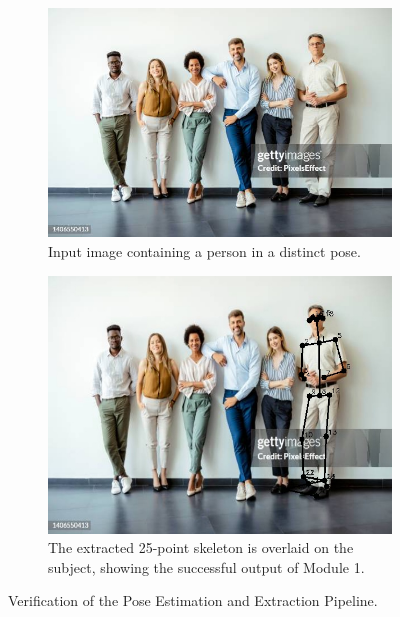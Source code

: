 \documentclass{article}
\begin{document}
\begin{figure}[h!]
    \centering
    \begin{subfigure}[b]{0.48\textwidth}
        \includegraphics[width=\textwidth]{Testing/test1.jpg}
        \caption{Input image containing a person in a distinct pose.}
        \label{fig:input_image}
    \end{subfigure}
    \hfill
    \begin{subfigure}[b]{0.48\textwidth}
        \includegraphics[width=\textwidth]{Testing/output_pose.jpg}
        \caption{The extracted 25-point skeleton is overlaid on the subject, showing the successful output of Module 1.}
        \label{fig:skeleton_output}
    \end{subfigure}
    \caption{Verification of the Pose Estimation and Extraction Pipeline.}
    \label{fig:pose_extraction}
\end{figure}
\end{document}

